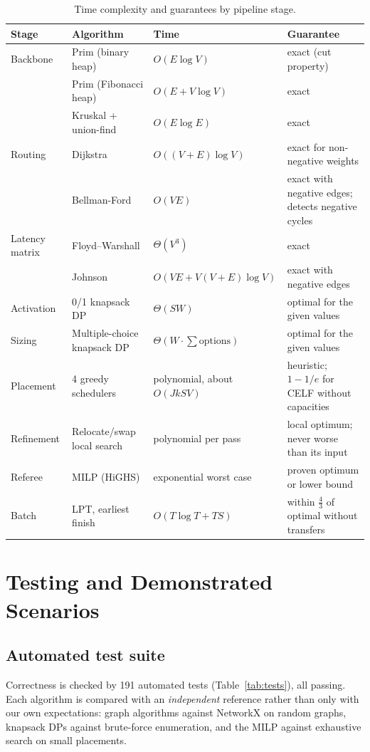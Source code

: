 \begin{table}[!htbp]
\centering\small
\caption{Time complexity and guarantees by pipeline stage.}\label{tab:cx}
\begin{tabularx}{\textwidth}{@{}p{2.7cm}p{3.6cm}p{4.2cm}X@{}}
\toprule
Stage & Algorithm & Time & Guarantee\\
\midrule
Backbone & Prim (binary heap) & $O(E\log V)$ & exact (cut property)\\
 & Prim (Fibonacci heap) & $O(E + V\log V)$ & exact\\
 & Kruskal + union-find & $O(E\log E)$ & exact\\
Routing & Dijkstra & $O((V+E)\log V)$ & exact for non-negative weights\\
 & Bellman-Ford & $O(VE)$ & exact with negative edges; detects negative cycles\\
Latency matrix & Floyd--Warshall & $\Theta(V^3)$ & exact\\
 & Johnson & $O(VE + V(V+E)\log V)$ & exact with negative edges\\
Activation & 0/1 knapsack DP & $\Theta(SW)$ & optimal for the given values\\
Sizing & Multiple-choice knapsack DP & $\Theta(W\cdot\sum\text{options})$ & optimal for the given values\\
Placement & 4 greedy schedulers & polynomial, about $O(J k S V)$ & heuristic; $1-1/e$ for CELF without capacities\\
Refinement & Relocate/swap local search & polynomial per pass & local optimum; never worse than its input\\
Referee & MILP (HiGHS) & exponential worst case & proven optimum or lower bound\\
Batch & LPT, earliest finish & $O(T\log T + T S)$ & within $\tfrac43$ of optimal without transfers\\
\bottomrule
\end{tabularx}
\end{table}

\section{Testing and Demonstrated Scenarios}\label{sec:test}

\subsection{Automated test suite}
Correctness is checked by 191 automated tests (Table~\ref{tab:tests}), all passing. Each algorithm is compared with an \emph{independent} reference rather than only with our own expectations: graph algorithms against NetworkX on random graphs, knapsack DPs against brute-force enumeration, and the MILP against exhaustive search on small placements.


